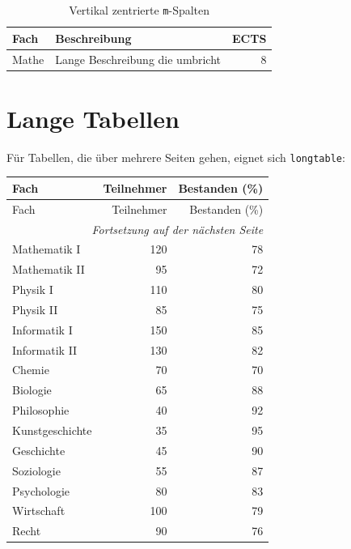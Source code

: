 \begin{table}[htbp]
    \centering
    \caption{Vertikal zentrierte \texttt{m}-Spalten}
    \label{tab:m-spalten}
    \begin{tabular}{m{3cm} m{5cm} r}
        \toprule
        Fach & Beschreibung & ECTS \\
        \midrule
        Mathe & Lange Beschreibung die umbricht & 8 \\
        \bottomrule
    \end{tabular}
\end{table}

\chapter{Lange Tabellen}
\label{sec:longtable}

Für Tabellen, die über mehrere Seiten gehen, eignet sich \texttt{longtable}:

\begin{longtable}{lrr}
    \toprule
    Fach & Teilnehmer & Bestanden (\%) \\
    \midrule
    \endfirsthead

    \toprule
    Fach & Teilnehmer & Bestanden (\%) \\
    \midrule
    \endhead

    \midrule
    \multicolumn{3}{r}{\textit{Fortsetzung auf der nächsten Seite}} \\
    \endfoot

    \bottomrule
    \endlastfoot

    Mathematik I & 120 & 78 \\
    Mathematik II & 95 & 72 \\
    Physik I & 110 & 80 \\
    Physik II & 85 & 75 \\
    Informatik I & 150 & 85 \\
    Informatik II & 130 & 82 \\
    Chemie & 70 & 70 \\
    Biologie & 65 & 88 \\
    Philosophie & 40 & 92 \\
    Kunstgeschichte & 35 & 95 \\
    Geschichte & 45 & 90 \\
    Soziologie & 55 & 87 \\
    Psychologie & 80 & 83 \\
    Wirtschaft & 100 & 79 \\
    Recht & 90 & 76 \\
\end{longtable}